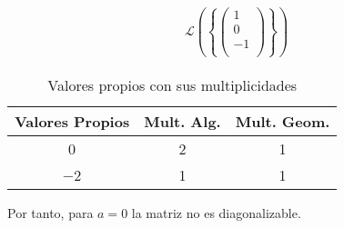 \begin{ejercicio}
\begin{enumerate}
\begin{itemize}
\begin{equation*}
\begin{split}
               \mathcal{L}\left(\left\{ \left(\begin{array}{c}
                    1 \\
                    0 \\
                    -1 \\
               \end{array}\right)
               \right\}\right)
           \end{split}\end{equation*}
           \begin{table}[H]
                \centering
                \begin{tabular}{c|c|c}
                    Valores Propios & Mult. Alg. & Mult. Geom. \\ \hline 
                    0 & 2 & 1\\
                    $-$2 & 1 & 1\\
                \end{tabular}
                \caption{Valores propios con sus multiplicidades}
            \end{table}
            Por tanto, para $a=0$ la matriz no es diagonalizable.


\end{itemize}
\end{enumerate}
\end{ejercicio}
